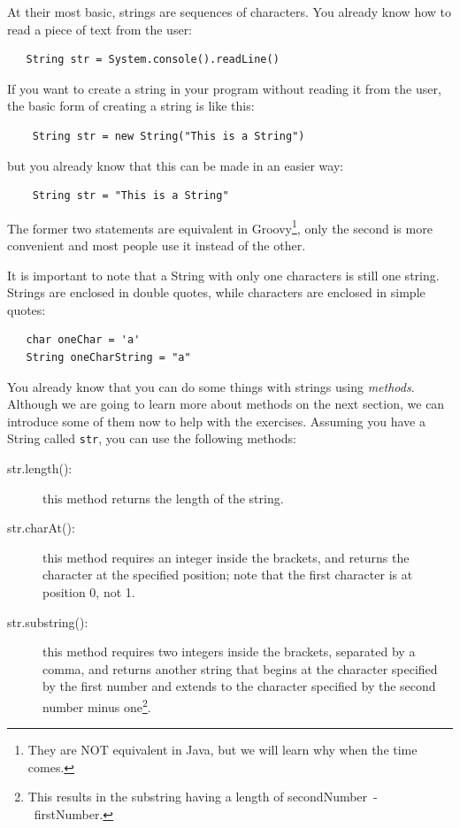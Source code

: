 At their most basic, strings are sequences of characters. You already
know how to read a piece of text from the user: 

\begin{verbatim}
   String str = System.console().readLine()
\end{verbatim}

If you want to create a string in your program without reading it from
the user, the basic form of creating a string is like this: 

\begin{verbatim}
    String str = new String("This is a String")
\end{verbatim}

but you already know that this can be made in an easier way: 

\begin{verbatim}
    String str = "This is a String"
\end{verbatim}

The former two statements are equivalent in Groovy\footnote{They are
  NOT equivalent in Java, but we will learn why when the time
  comes.}, only the second is more convenient and most people use it
instead of the other. 

It is important to note that a String with only one characters is
still one string. Strings are enclosed in double quotes, while
characters are enclosed in simple quotes:

\begin{verbatim}
   char oneChar = 'a'
   String oneCharString = "a"
\end{verbatim}

% 

You already know that you can do some things with strings using
\emph{methods}. Although we are going to learn more about methods on
the next section, we can introduce some of them now to help with the
exercises. Assuming you have a String called \verb+str+, you can use
the following methods:

\begin{description}
\item[str.length(): ] this method returns the length of the string.
\item[str.charAt(): ] this method requires an integer inside the
  brackets, and returns the character at the specified position;
  note that the first character is at position 0, not 1.
\item[str.substring(): ] this method requires two integers inside the
  brackets, separated by a comma, and returns another string that
  begins at the character specified by the first number and extends to
  the character specified by the second number minus one\footnote{This
  results in the substring having a length of
  secondNumber~-~firstNumber.}.  
\end{description}

